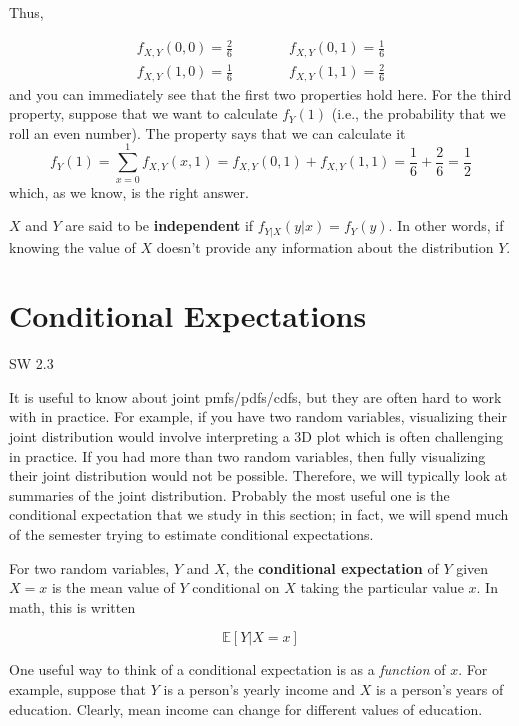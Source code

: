 \documentclass[
  letterpaper,
  DIV=11,
  numbers=noendperiod]{scrreprt}
\begin{document}
Thus,

\[
\begin{aligned}
  f_{X,Y}(0, 0) = \frac{2}{6} \qquad \qquad f_{X,Y}(0,1) = \frac{1}{6} \\
  f_{X,Y}(1, 0) = \frac{1}{6} \qquad \qquad f_{X,Y}(1,1) = \frac{2}{6}
\end{aligned}
\] and you can immediately see that the first two properties hold here.
For the third property, suppose that we want to calculate \(f_Y(1)\)
(i.e., the probability that we roll an even number). The property says
that we can calculate it \[
  f_Y(1) = \sum_{x=0}^1 f_{X,Y}(x,1) = f_{X,Y}(0,1) + f_{X,Y}(1,1) = \frac{1}{6} + \frac{2}{6} = \frac{1}{2}
\] which, as we know, is the right answer.

\(X\) and \(Y\) are said to be \textbf{independent} if
\(f_{Y|X}(y|x) = f_Y(y)\). In other words, if knowing the value of \(X\)
doesn't provide any information about the distribution \(Y\).

\section{Conditional Expectations}\label{conditional-expectations}

SW 2.3

It is useful to know about joint pmfs/pdfs/cdfs, but they are often hard
to work with in practice. For example, if you have two random variables,
visualizing their joint distribution would involve interpreting a 3D
plot which is often challenging in practice. If you had more than two
random variables, then fully visualizing their joint distribution would
not be possible. Therefore, we will typically look at summaries of the
joint distribution. Probably the most useful one is the conditional
expectation that we study in this section; in fact, we will spend much
of the semester trying to estimate conditional expectations.

For two random variables, \(Y\) and \(X\), the \textbf{conditional
expectation} of \(Y\) given \(X=x\) is the mean value of \(Y\)
conditional on \(X\) taking the particular value \(x\). In math, this is
written

\[
  \mathbb{E}[Y|X=x]
\]

One useful way to think of a conditional expectation is as a
\emph{function} of \(x\). For example, suppose that \(Y\) is a person's
yearly income and \(X\) is a person's years of education. Clearly, mean
income can change for different values of education.
\end{document}
